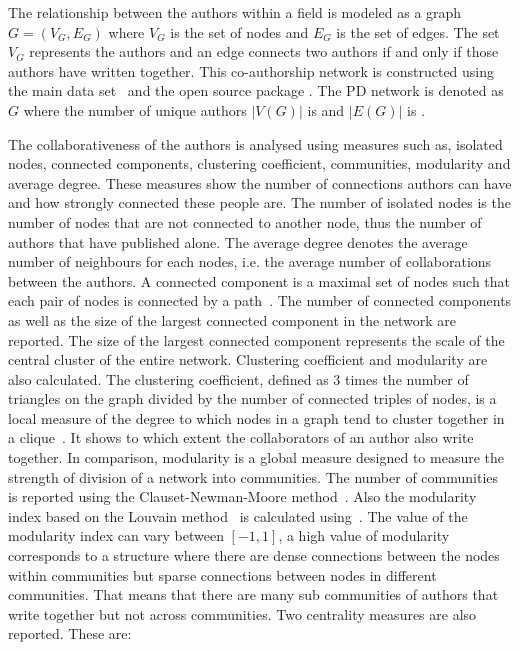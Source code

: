 \documentclass{article}
\theoremstyle{definition}
\newcommand{\authors}{}
\newcommand{\edges}{\unskip}
\begin{document}
The relationship between the authors within a field is modeled as a graph
\(G = (V_G, E_G)\) where \(V_G\) is the set of nodes and \(E_G\)  is the set of
edges. The set \(V_G\) represents the authors and an edge connects two authors
if and only if those authors have written together. This co-authorship network is
constructed using the main data set~\cite{pd_data_2018} and the open source package
\cite{networkx}. The PD network is denoted as \(G\) where the
number of unique authors \(|V(G)|\) is \authors and \(|E(G)|\) is \edges.


The collaborativeness of the authors is analysed using measures such as, isolated nodes,
connected components, clustering coefficient, communities, modularity and average degree.
These measures show the number of connections authors can have
and how strongly connected these people are. The number of isolated nodes is the
number of nodes that are not connected to another node, thus the
number of authors that have published alone. The average degree denotes the average
number of neighbours for each nodes, i.e. the average number of collaborations
between the authors.
A connected component is a maximal set of nodes such that each pair of nodes is
connected by a path~\cite{Easley2010}. The number of connected components as well as the size of the
largest connected component in the network are reported.
The size of the largest connected component represents the scale of the central cluster
of the entire network.
Clustering coefficient and modularity are also calculated. The clustering
coefficient, defined as 3 times the number of triangles on the graph divided
by the number of connected triples of nodes, is a local measure of the degree to
which nodes in a graph tend to cluster together
in a clique~\cite{Easley2010}. It shows to which extent the collaborators
of an author also write together.
In comparison, modularity is a global measure designed to measure the strength of
division of a network into communities. The number of communities is reported
using the Clauset-Newman-Moore method~\cite{clauset2004}. Also the modularity index
based on the Louvain method~\cite{Blondel2008} is calculated using~\cite{python_louvain}. The value
of the modularity index can vary between \([-1, 1]\), a high value of modularity
corresponds to a structure where there are dense connections between the nodes within
communities but sparse connections between nodes in different communities.
That means that there are many sub communities of authors that write together
but not across communities.
Two centrality measures are also reported. These are:
\end{document}
